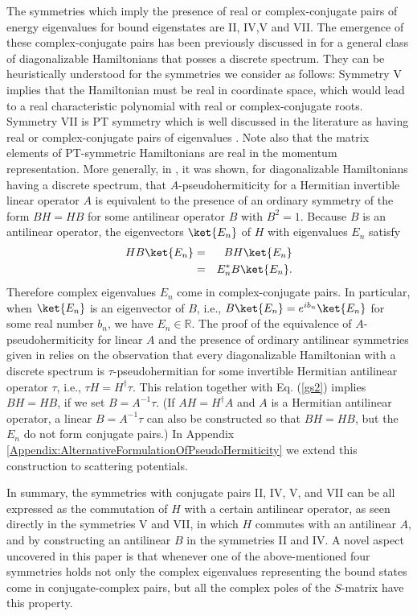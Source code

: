 The symmetries which imply the presence of real or complex-conjugate pairs of energy eigenvalues for bound eigenstates
are II, IV,V and VII.
The emergence of these complex-conjugate pairs has been previously discussed in \cite{Mostafazadeh2002,Bender2010} for a general class of diagonalizable Hamiltonians that posses a discrete spectrum. They can be heuristically understood for the symmetries we consider as follows: Symmetry V implies that the Hamiltonian must be real in coordinate space, which would lead to a real characteristic polynomial with real or complex-conjugate roots. Symmetry VII is PT symmetry which is well discussed in the literature as having real or complex-conjugate pairs of eigenvalues \cite{Bender1998}. Note also that the matrix elements of PT-symmetric Hamiltonians are real in the momentum representation. More generally, in \cite{Mostafazadeh2002b}, it was shown, for diagonalizable Hamiltonians having a discrete spectrum, that $A$-pseudohermiticity for a Hermitian invertible linear operator $A$ is equivalent to the presence of an ordinary symmetry of the form $BH = HB$ for some antilinear operator $B$ with $B^2 = 1$. Because $B$ is an antilinear operator, the eigenvectors $\ket{E_n}$  of $H$ with eigenvalues $E_n$ satisfy
%
\begin{eqnarray}
	H B \ket{E_n}&=&B H \ket{E_n} \nonumber \\
	&=&E_{n}^{*} B \ket{E_n}.
\end{eqnarray}
%
Therefore complex eigenvalues $E_n$ come in complex-conjugate pairs. In particular, when $\ket{E_n}$  is an eigenvector of $B$, i.e., $B\ket{E_n} = e^{ib_n} \ket{E_n}$ for some real number $b_n$, we have $E_n \in \mathbb{R}$.
The proof of the equivalence of $A$-pseudohermiticity for linear $A$ and the presence of ordinary antilinear symmetries given in \cite{Mostafazadeh2002b} relies on the observation that every diagonalizable Hamiltonian with a discrete spectrum is $\tau$-pseudohermitian for some invertible Hermitian antilinear operator $\tau$, i.e.,
$\tau H = H^\dagger\tau$. This relation together with Eq. (\ref{gs2}) implies $BH = HB$,
if we set $B = A^{-1}\tau$. (If $AH=H^\dagger A$ and $A$ is a Hermitian antilinear operator, a linear $B = A^{-1}\tau$ can also be constructed so that $BH=HB$, but the $E_n$ do not form conjugate pairs.)
In Appendix \ref{Appendix:AlternativeFormulationOfPseudoHermiticity} we extend this construction to scattering potentials.

In summary, the symmetries with conjugate pairs II, IV, V, and VII can be all expressed as the commutation of $H$ with a certain antilinear operator, as seen directly in the symmetries V and VII, in which $H$ commutes with an antilinear $A$,  and by constructing an antilinear $B$ in the symmetries II and IV.
A novel aspect uncovered in this paper is that whenever one of  the above-mentioned four symmetries holds not only the complex eigenvalues representing the bound states come in conjugate-complex pairs, but all the complex poles of the $S$-matrix have this property.

